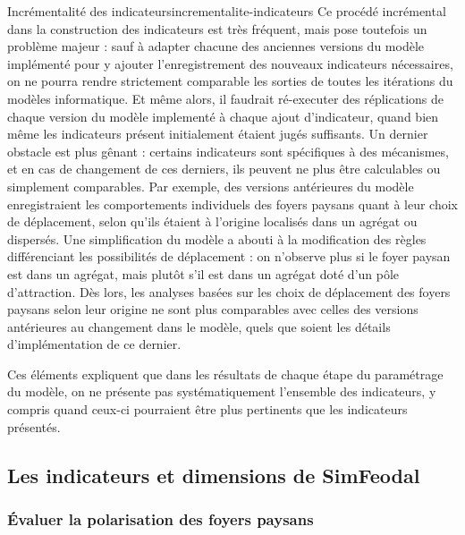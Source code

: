 \begin{encadre}{Incrémentalité des indicateurs}{incrementalite-indicateurs}
Ce procédé incrémental dans la construction des indicateurs est très fréquent, mais pose toutefois un problème majeur :
sauf à adapter chacune des anciennes versions du modèle implémenté pour y ajouter l'enregistrement des nouveaux indicateurs nécessaires, on ne pourra rendre strictement comparable les sorties de toutes les itérations du modèles informatique.
Et même alors, il faudrait ré-executer des réplications de chaque version du modèle implementé à chaque ajout d'indicateur, quand bien même les indicateurs présent initialement étaient jugés suffisants.
Un dernier obstacle est plus gênant :
certains indicateurs sont spécifiques à des mécanismes, et en cas de changement de ces derniers, ils peuvent ne plus être calculables ou simplement comparables.
Par exemple, des versions antérieures du modèle enregistraient les comportements individuels des foyers paysans quant à leur \og choix\fg{} de déplacement, selon qu'ils étaient à l'origine localisés dans un agrégat ou dispersés.
Une simplification du modèle a abouti à la modification des règles différenciant les possibilités de déplacement :
on n'observe plus si le foyer paysan est dans un agrégat, mais plutôt s'il est dans un agrégat doté d'un pôle d'attraction.
Dès lors, les analyses basées sur les choix de déplacement des foyers paysans selon leur origine ne sont plus comparables avec celles des versions antérieures au changement dans le modèle, quels que soient les détails d'implémentation de ce dernier.

Ces éléments expliquent que dans les résultats de chaque étape du paramétrage du modèle, on ne présente pas systématiquement l'ensemble des indicateurs, y compris quand ceux-ci pourraient être plus pertinents que les indicateurs présentés.
\end{encadre}

\clearpage
\subsection{Les indicateurs et dimensions de SimFeodal}

\subsubsection{Évaluer la polarisation des foyers paysans \label{subsub:polarisation}}

